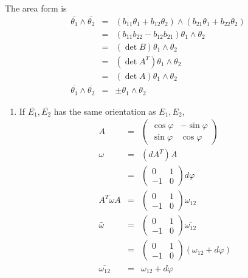 \documentclass{article}
\newenvironment{enumeratenumeric}{\begin{enumerate}[1.] }{\end{enumerate}}
\begin{document}
The area form is
\begin{eqnarray*}
  \overline{\theta_1} \wedge \overline{\theta_2} & = & (b_{11} \theta_1 +
  b_{12} \theta_2) \wedge (b_{21} \theta_1 + b_{22} \theta_2)\\
  & = & (b_{11} b_{22} - b_{12} b_{21}) \theta_1 \wedge \theta_2\\
  & = & (\det B) \theta_1 \wedge \theta_2\\
  & = & (\det A^T) \theta_1 \wedge \theta_2\\
  & = & (\det A) \theta_1 \wedge \theta_2\\
  \overline{\theta_1} \wedge \overline{\theta_2} & = & \pm \theta_1 \wedge
  \theta_2
\end{eqnarray*}
\begin{enumeratenumeric}
  \item If $\overline{E_1}, \overline{E_2}$ has the same orientation as $E_1,
  E_2$,
  \begin{eqnarray}
    A & = & \left(\begin{array}{cc}
      \cos \varphi & - \sin \varphi\\
      \sin \varphi & \cos \varphi
    \end{array}\right) \nonumber\\
    \omega & = & (d A^T) A \nonumber\\
    & = & \left(\begin{array}{cc}
      0 & 1\\
      - 1 & 0
    \end{array}\right) d \varphi \nonumber\\
    A^T \omega A & = & \left(\begin{array}{cc}
      0 & 1\\
      - 1 & 0
    \end{array}\right) \omega_{12} \nonumber\\
    \bar{\omega} & = & \left(\begin{array}{cc}
      0 & 1\\
      - 1 & 0
    \end{array}\right) \overline{\omega_{12}} \nonumber\\
    & = & \left(\begin{array}{cc}
      0 & 1\\
      - 1 & 0
    \end{array}\right) (\omega_{12} + d \varphi) \nonumber\\
    \overline{\omega_{12}} & = & \omega_{12} + d \varphi \\

\end{eqnarray}
\end{enumeratenumeric}
\end{document}
